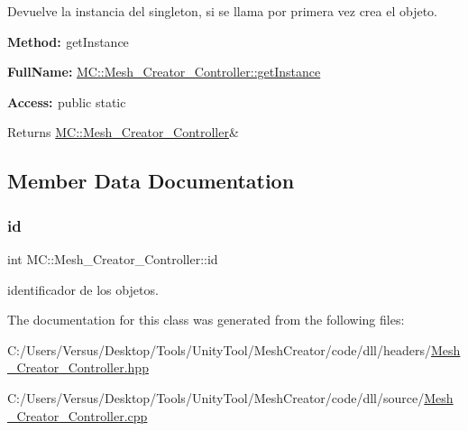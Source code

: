 Devuelve la instancia del singleton, si se llama por primera vez crea el objeto. 

{\bfseries{Method\+: }} get\+Instance

{\bfseries{Full\+Name\+:}} \mbox{\hyperlink{class_m_c_1_1_mesh___creator___controller_af0292e4c19965d62bd9b7b92c1adbbc2}{M\+C\+::\+Mesh\+\_\+\+Creator\+\_\+\+Controller\+::get\+Instance}}

{\bfseries{Access\+: }} public static \begin{DoxyReturn}{Returns}
\mbox{\hyperlink{class_m_c_1_1_mesh___creator___controller}{M\+C\+::\+Mesh\+\_\+\+Creator\+\_\+\+Controller}}\& 
\end{DoxyReturn}


\subsection{Member Data Documentation}
\mbox{\label{class_m_c_1_1_mesh___creator___controller_add6a4dc53dc9e52cd7897986c5e743da}} 
\subsubsection{\texorpdfstring{id}{id}}
{\footnotesize\ttfamily int M\+C\+::\+Mesh\+\_\+\+Creator\+\_\+\+Controller\+::id}

identificador de los objetos. 

The documentation for this class was generated from the following files\+:\begin{DoxyCompactItemize}
\item 
C\+:/\+Users/\+Versus/\+Desktop/\+Tools/\+Unity\+Tool/\+Mesh\+Creator/code/dll/headers/\mbox{\hyperlink{_mesh___creator___controller_8hpp}{Mesh\+\_\+\+Creator\+\_\+\+Controller.\+hpp}}\item 
C\+:/\+Users/\+Versus/\+Desktop/\+Tools/\+Unity\+Tool/\+Mesh\+Creator/code/dll/source/\mbox{\hyperlink{_mesh___creator___controller_8cpp}{Mesh\+\_\+\+Creator\+\_\+\+Controller.\+cpp}}\end{DoxyCompactItemize}
